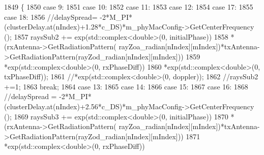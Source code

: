 \begin{DoxyCode}
1849                                                 \{
1850                                                 \textcolor{keywordflow}{case} 9:
1851                                                 \textcolor{keywordflow}{case} 10:
1852                                                 \textcolor{keywordflow}{case} 11:
1853                                                 \textcolor{keywordflow}{case} 12:
1854                                                 \textcolor{keywordflow}{case} 17:
1855                                                 \textcolor{keywordflow}{case} 18:
1856                                                         \textcolor{comment}{//delaySpread=
       -2*M\_PI*(clusterDelay.at(nIndex)+1.28*c\_DS)*m\_phyMacConfig->GetCenterFrequency ();}
1857                                                         raysSub2 += exp(std::complex<double>(0, 
      initialPhase))
1858                                                                 *(rxAntenna->GetRadiationPattern(
      rayZoa\_radian[nIndex][mIndex])*txAntenna->GetRadiationPattern(rayZod\_radian[nIndex][mIndex]))
1859                                                                 *exp(std::complex<double>(0, rxPhaseDiff))
1860                                                                 *exp(std::complex<double>(0, txPhaseDiff));
1861                                                                 \textcolor{comment}{//*exp(std::complex<double>(0, doppler));}
1862                                                         \textcolor{comment}{//raysSub2 +=1;}
1863                                                         \textcolor{keywordflow}{break};
1864                                                 \textcolor{keywordflow}{case} 13:
1865                                                 \textcolor{keywordflow}{case} 14:
1866                                                 \textcolor{keywordflow}{case} 15:
1867                                                 \textcolor{keywordflow}{case} 16:
1868                                                         \textcolor{comment}{//delaySpread =
       -2*M\_PI*(clusterDelay.at(nIndex)+2.56*c\_DS)*m\_phyMacConfig->GetCenterFrequency ();}
1869                                                         raysSub3 += exp(std::complex<double>(0, 
      initialPhase))
1870                                                                 *(rxAntenna->GetRadiationPattern(
      rayZoa\_radian[nIndex][mIndex])*txAntenna->GetRadiationPattern(rayZod\_radian[nIndex][mIndex]))
1871                                                                 *exp(std::complex<double>(0, rxPhaseDiff))

\end{DoxyCode}
